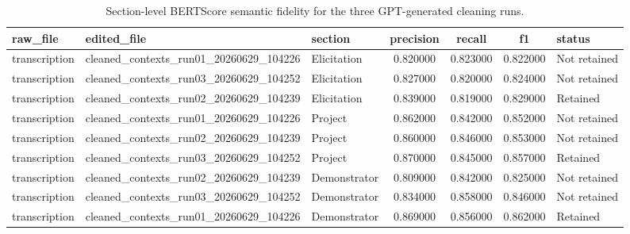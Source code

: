\begin{table}
\caption{Section-level BERTScore semantic fidelity for the three GPT-generated cleaning runs.}
\label{tab:bertscore_semantic_fidelity_runs}
\begin{tabular}{ll l c c c l}
\toprule
raw_file & edited_file & section & precision & recall & f1 & status \\
\midrule
transcription & cleaned_contexts_run01_20260629_104226 & Elicitation & 0.820000 & 0.823000 & 0.822000 & Not retained \\
transcription & cleaned_contexts_run03_20260629_104252 & Elicitation & 0.827000 & 0.820000 & 0.824000 & Not retained \\
transcription & cleaned_contexts_run02_20260629_104239 & Elicitation & 0.839000 & 0.819000 & 0.829000 & Retained \\
transcription & cleaned_contexts_run01_20260629_104226 & Project & 0.862000 & 0.842000 & 0.852000 & Not retained \\
transcription & cleaned_contexts_run02_20260629_104239 & Project & 0.860000 & 0.846000 & 0.853000 & Not retained \\
transcription & cleaned_contexts_run03_20260629_104252 & Project & 0.870000 & 0.845000 & 0.857000 & Retained \\
transcription & cleaned_contexts_run02_20260629_104239 & Demonstrator & 0.809000 & 0.842000 & 0.825000 & Not retained \\
transcription & cleaned_contexts_run03_20260629_104252 & Demonstrator & 0.834000 & 0.858000 & 0.846000 & Not retained \\
transcription & cleaned_contexts_run01_20260629_104226 & Demonstrator & 0.869000 & 0.856000 & 0.862000 & Retained \\
\bottomrule
\end{tabular}
\end{table}

